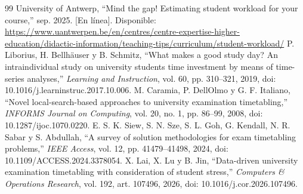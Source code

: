 \documentclass[conference]{IEEEtran}
\begin{document}
\begin{thebibliography}{99}
 University of Antwerp, ``Mind the gap! Estimating student workload for your course,'' sep. 2025. [En línea]. Disponible: \url{https://www.uantwerpen.be/en/centres/centre-expertise-higher-education/didactic-information/teaching-tips/curriculum/student-workload/}
 P. Liborius, H. Bellhäuser y B. Schmitz, ``What makes a good study day? An intraindividual study on university students\textquotesingle{} time investment by means of time-series analyses,'' \emph{Learning and Instruction}, vol. 60, pp. 310--321, 2019, doi: 10.1016/j.learninstruc.2017.10.006.
 M. Caramia, P. Dell\textquotesingle Olmo y G. F. Italiano, ``Novel local-search-based approaches to university examination timetabling,'' \emph{INFORMS Journal on Computing}, vol. 20, no. 1, pp. 86--99, 2008, doi: 10.1287/ijoc.1070.0220.
 E. S. K. Siew, S. N. Sze, S. L. Goh, G. Kendall, N. R. Sabar y S. Abdullah, ``A survey of solution methodologies for exam timetabling problems,'' \emph{IEEE Access}, vol. 12, pp. 41479--41498, 2024, doi: 10.1109/ACCESS.2024.3378054.
 X. Lai, X. Lu y B. Jin, ``Data-driven university examination timetabling with consideration of student stress,'' \emph{Computers \& Operations Research}, vol. 192, art. 107496, 2026, doi: 10.1016/j.cor.2026.107496.
\end{thebibliography}
\end{document}
